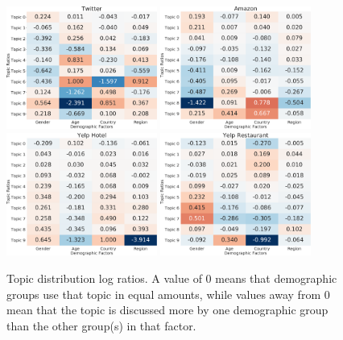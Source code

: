 \begin{figure}[t!]
\centering
\includegraphics[width=0.44\textwidth]{./images/chapter4/twitter_ratio.pdf}
\includegraphics[width=0.44\textwidth]{./images/chapter4/amazon_ratio.pdf}
\newline
\includegraphics[width=0.44\textwidth]{./images/chapter4/yelp_hotel_ratio.pdf}
\includegraphics[width=0.44\textwidth]{./images/chapter4/yelp_rest_ratio.pdf}
\caption{Topic distribution log ratios. %
A value of 0 means that demographic groups use that topic in equal amounts, while values away from 0 mean that the topic is discussed more by one demographic group than the other group(s) in that factor.
}
\label{chap4:fig:vary}
\end{figure}

